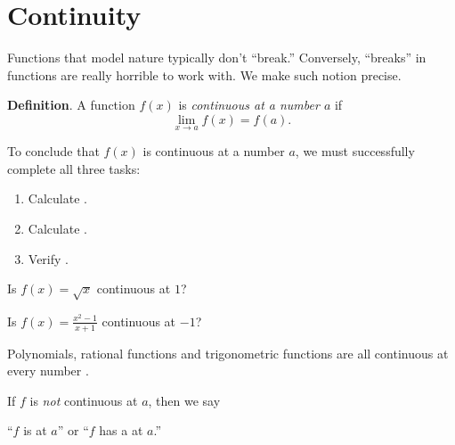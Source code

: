 \documentclass[../main.tex]{subfiles}
\begin{document}
 \section{Continuity}
Functions that model nature typically don't ``break.'' Conversely, ``breaks'' in functions are really horrible to work with. We make such notion precise. 

\begin{mdframed}[style=withref]
  \textbf{Definition}. A function \(f(x)\) is \emph{continuous at a number \(a\)} if 
  \[
    {\lim_{x \to a} f(x) = f(a).}
  \]
\end{mdframed}

To conclude that \(f(x)\) is continuous at a number \(a\), we must successfully complete all three tasks:
\begin{enumerate}[label=(C\arabic*), itemsep={2ex}]
  \item Calculate \underline{\hspace{3in}}.
  \item Calculate \underline{\hspace{3in}}.
  \item Verify \underline{\hspace{3.23in}}.
\end{enumerate}

\begin{example}
  Is \(f(x) = \sqrt{x}\) continuous at \(1\)? 

\end{example}

\begin{example}
  Is \(f(x) = \frac{x^{2}-1}{x+1}\) continuous at \(-1\)? 

\end{example}

\begin{mdframed}[style=withref-compact]
  Polynomials, rational functions and trigonometric functions are all continuous at every number \underline{\hspace{2in}}. 

\end{mdframed}
\clearpage


If \(f\) is \emph{not} continuous at \(a\), then we say
\begin{center}
  ``\(f\) is  at \(a\)'' \quad or \quad ``\(f\) has a  at \(a\).''
\end{center}
\end{document}
